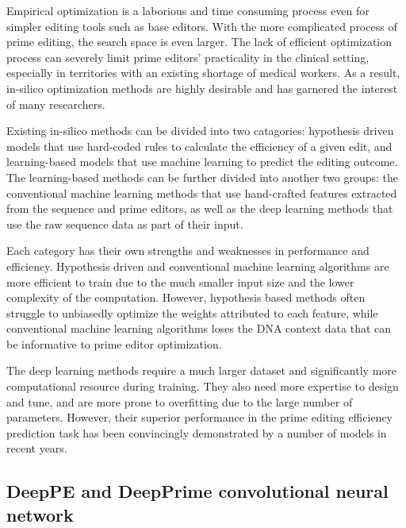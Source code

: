 Empirical optimization is a laborious and time consuming process even for simpler editing tools such as base editors. With the more complicated process of prime editing, the search space is even larger. The lack of efficient optimization process can severely limit prime editors' practicality in the clinical setting, especially in territories with an existing shortage of medical workers. As a result, in-silico optimization methods are highly desirable and has garnered the interest of many researchers. 

Existing in-silico methods can be divided into two catagories: hypothesis driven models that use hard-coded rules to calculate the efficiency of a given edit\cite{hsuPrimeDesignSoftwareRapid2021,hwangPEDesignerPEAnalyzerWebbased2021}, and learning-based models that use machine learning to predict the editing outcome. 
The learning-based methods can be further divided into another two groups: the conventional machine learning methods that use hand-crafted features extracted from the sequence and prime editors\cite{liEasyPrimeMachineLearning2021,koeppelPredictionPrimeEditing2023}, as well as the deep learning methods that use the raw sequence data as part of their input\cite{yuPredictionEfficienciesDiverse2023,kimPredictingEfficiencyPrime2021, mathisPredictingPrimeEditing2023}. 

Each category has their own strengths and weaknesses in performance and efficiency. Hypothesis driven and conventional machine learning algorithms are more efficient to train due to the much smaller input size and the lower complexity of the computation. However, hypothesis based methods often struggle to unbiasedly optimize the weights attributed to each feature\cite{liEasyPrimeMachineLearning2021}, while conventional machine learning algorithms loses the DNA context data that can be informative to prime editor optimization. 

The deep learning methods require a much larger dataset and significantly more computational resource during training. They also need more expertise to design and tune, and are more prone to overfitting due to the large number of parameters. However, their superior performance in the prime editing efficiency prediction task has been convincingly demonstrated by a number of models in recent years.


\subsection{DeepPE and DeepPrime convolutional neural network}



